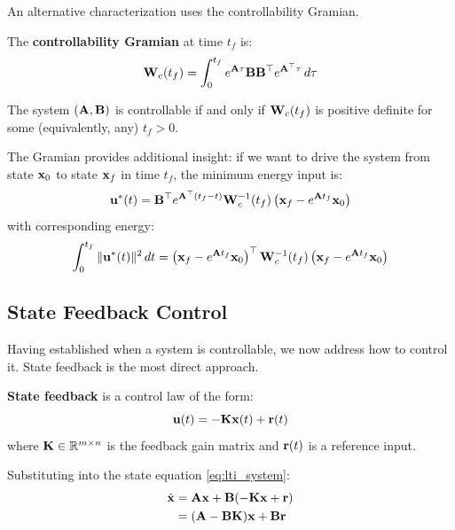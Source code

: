 An alternative characterization uses the controllability Gramian.

\begin{definition}
The \textbf{controllability Gramian} at time $t_f$ is:
\begin{equation}
\mathbf{W}_c(t_f) = \int_0^{t_f} e^{\mathbf{A}\tau}\mathbf{B}\mathbf{B}^\top e^{\mathbf{A}^\top\tau}\,d\tau
\label{eq:gramian}
\end{equation}
\end{definition}

\begin{theorem}
The system $(\mathbf{A}, \mathbf{B})$ is controllable if and only if $\mathbf{W}_c(t_f)$ is positive definite for some (equivalently, any) $t_f > 0$.
\end{theorem}

The Gramian provides additional insight: if we want to drive the system from state $\mathbf{x}_0$ to state $\mathbf{x}_f$ in time $t_f$, the minimum energy input is:
\begin{equation}
\mathbf{u}^*(t) = \mathbf{B}^\top e^{\mathbf{A}^\top(t_f-t)}\mathbf{W}_c^{-1}(t_f)\left(\mathbf{x}_f - e^{\mathbf{A} t_f}\mathbf{x}_0\right)
\end{equation}
with corresponding energy:
\begin{equation}
\int_0^{t_f} \|\mathbf{u}^*(t)\|^2\,dt = \left(\mathbf{x}_f - e^{\mathbf{A} t_f}\mathbf{x}_0\right)^\top\mathbf{W}_c^{-1}(t_f)\left(\mathbf{x}_f - e^{\mathbf{A} t_f}\mathbf{x}_0\right)
\end{equation}

\subsection{State Feedback Control}

Having established when a system is controllable, we now address how to control it. State feedback is the most direct approach.

\begin{definition}
\textbf{State feedback} is a control law of the form:
\begin{equation}
\mathbf{u}(t) = -\mathbf{K}\mathbf{x}(t) + \mathbf{r}(t)
\label{eq:state_feedback}
\end{equation}
where $\mathbf{K} \in \mathbb{R}^{m \times n}$ is the feedback gain matrix and $\mathbf{r}(t)$ is a reference input.
\end{definition}

Substituting into the state equation \eqref{eq:lti_system}:
\begin{align}
\dot{\mathbf{x}} &= \mathbf{A}\mathbf{x} + \mathbf{B}(-\mathbf{K}\mathbf{x} + \mathbf{r}) \\
&= (\mathbf{A} - \mathbf{B}\mathbf{K})\mathbf{x} + \mathbf{B}\mathbf{r}
\label{eq:closed_loop}
\end{align}

